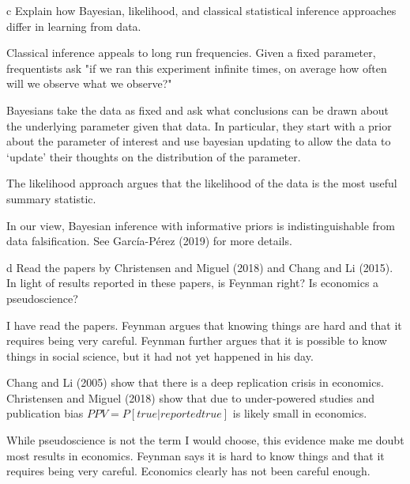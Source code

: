 \documentclass{article}
\begin{document}
\begin{problem}{c}
Explain how Bayesian, likelihood, and classical statistical inference approaches differ in learning from data.
\end{problem}

\begin{solution}

Classical inference appeals to long run frequencies. Given a fixed parameter, frequentists ask "if we ran this experiment infinite times, on average how often will we observe what we observe?"

Bayesians take the data as fixed and ask what conclusions can be drawn about the underlying parameter given that data. In particular, they start with a prior about the parameter of interest and use bayesian updating to allow the data to `update' their thoughts on the distribution of the parameter. 

The likelihood approach argues that the likelihood of the data is the most useful summary statistic. 

In our view, Bayesian inference with informative priors is indistinguishable from data falsification. See  García-Pérez (2019) for more details. 
\end{solution}

\begin{problem}{d}
 Read the papers by Christensen and Miguel (2018) and Chang and Li (2015). In light of results reported in these papers, is Feynman right? Is economics a pseudoscience?
\end{problem}

\begin{solution}
I have read the papers. Feynman argues that knowing things are hard and that it requires being very careful. Feynman further argues that it is possible to know things in social science, but it had not yet happened in his day. 

Chang and Li (2005) show that there is a deep replication crisis in economics. Christensen and Miguel (2018) show that due to under-powered studies and publication bias $PPV=P[true|reported true]$ is likely small in economics. 

While pseudoscience is not the term I would choose, this evidence make me doubt most results in economics. Feynman says it is hard to know things and that it requires being very careful. Economics clearly has not been careful enough. 

\end{solution}
\end{document}
